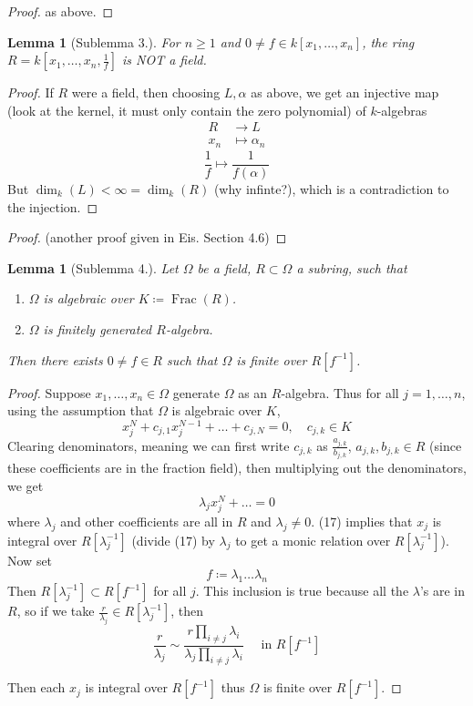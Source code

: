 \documentclass[12pt]{article}
\DeclareMathOperator{\Frac}{Frac}
\newcommand{\mapp}[4]{\begin{align*}
#1 &\to #2\\
#3 & \mapsto #4
\end{align*}}
\newtheorem{lemma}[theorem]{Lemma}
\theoremstyle{definition}
\begin{document}
\begin{proof}
as above.
\end{proof}
\begin{lemma}[Sublemma 3.]
For $n\geq 1$ and $0\neq f\in k[x_1,\dots ,x_n]$, the ring $R= k[x_1,\dots, x_n, \frac{1}{f}]$ is NOT a field.
\end{lemma}
\begin{proof}
If $R$ were a field, then choosing $L, \alpha$ as above, we get an injective map (look at the kernel, it must only contain the zero polynomial) of $k$-algebras
\[
\mapp{R}{L}{x_n}{\alpha_n}
\]
\[
\frac{1}{f} \mapsto \frac{1}{f(\alpha)}
\]
But $\dim_k(L) < \infty = \dim_k(R)$ (why infinte?), which is a contradiction to the injection.
\end{proof}
\begin{proof}
(another proof given in Eis. Section 4.6)
\end{proof}
\begin{lemma}[Sublemma 4.]
Let $\Omega $ be a field, $R\subset \Omega$ a subring, such that
\begin{enumerate}
    \item $\Omega$ is algebraic over $K \coloneqq \Frac(R)$.
    \item $\Omega$ is finitely generated $R$-algebra.
\end{enumerate}
Then there exists $0\neq f \in R$ such that $\Omega$ is finite over $R[f^{-1}]$.
\end{lemma}
\begin{proof}
Suppose $x_1,\dots ,x_n \in \Omega$ generate $\Omega$ as an $R$-algebra. Thus for all $j= 1,\dots ,n$, using the assumption that $\Omega$ is algebraic over $K$,
\[
x_j^N + c_{j,1}x_j^{N-1}+\dots +c_{j,N} =0 , \quad c_{j,k} \in K
\]
Clearing denominators, meaning we can first write $c_{j,k}$ as $\frac{a_{j,k}}{b_{j,k}}$, $a_{j,k},b_{j,k} \in R$ (since these coefficients are in the fraction field), then multiplying out the denominators, we get
\begin{equation}
 \lambda_j x_j^N + \dots =0   
\end{equation}
where $\lambda_j$ and other coefficients are all in $R$ and $\lambda_j \neq 0$. (17) implies that $x_j$ is integral over $R[\lambda_j^{-1}]$ (divide (17) by $\lambda_j$ to get a monic relation over $R[\lambda_j^{-1}]$). Now set 
\[
f\coloneqq \lambda_1\dots  \lambda_n
\]
Then $R[\lambda_j^{-1}] \subset R[f^{-1}]$ for all $j$. This inclusion is true because all the $\lambda$'s are in $R$, so if we take $\frac{r}{\lambda_j} \in R[\lambda_j^{-1}]$, then
\[
\frac{r}{\lambda_j} \sim \frac{r\prod_{i\neq j} \lambda_i}{\lambda_j  \prod_{i\neq j} \lambda_i} \quad \text{ in }R[f^{-1}]
\]



Then each $x_j$ is integral over $R[f^{-1}]$ thus $\Omega$ is finite over $R[f^{-1}]$.
\end{proof}
\end{document}
